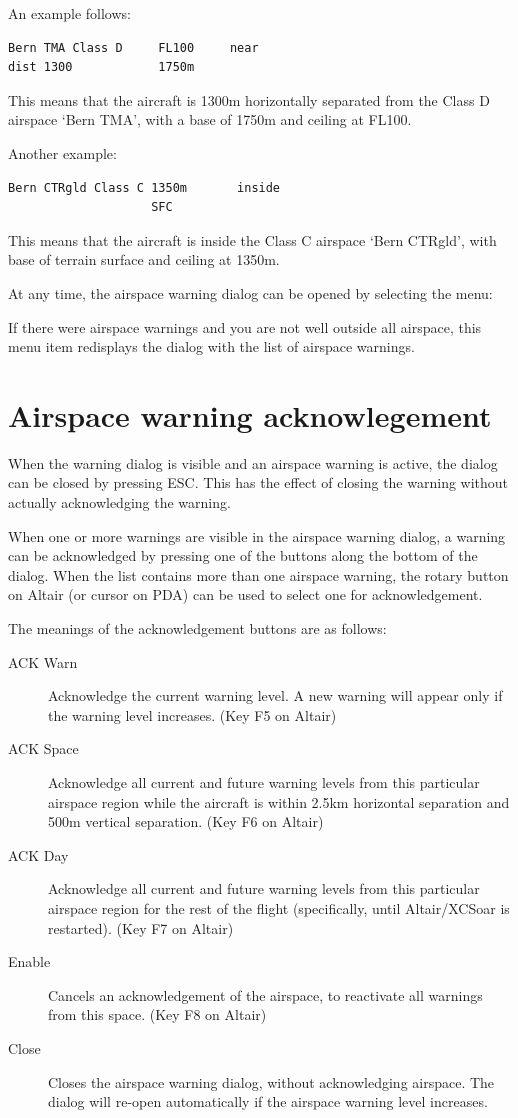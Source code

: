 \documentclass[a4paper,12pt]{refrep}
\begin{document}
An example follows:
\begin{verbatim}
Bern TMA Class D     FL100     near
dist 1300            1750m 
\end{verbatim}

This means that the aircraft is 1300m horizontally separated from the Class D airspace
`Bern TMA', with a base of 1750m and ceiling at FL100.

Another example:
\begin{verbatim}
Bern CTRgld Class C 1350m	    inside
                    SFC
\end{verbatim}

This means that the aircraft is inside the Class C airspace `Bern
CTRgld', with base of terrain surface and ceiling at 1350m.

At any time, the airspace warning dialog can be opened by selecting
the menu:

\blink{}

If there were airspace warnings and you are not well outside all airspace, this
menu item redisplays the dialog with the list of airspace warnings.


\section{Airspace warning acknowlegement}

When the warning dialog is visible and an airspace warning is active, the
dialog can be closed by pressing ESC.  This has the effect of closing the
warning without actually acknowledging the warning.  

When one or more warnings are visible in the airspace warning dialog,
a warning can be acknowledged by pressing one of the buttons along the bottom
of the dialog.  When the list contains more than one airspace warning,
the rotary button on Altair (or cursor on PDA) can be used to select one
for acknowledgement.

The meanings of the acknowledgement buttons are as follows:
\begin{description}
\item[ACK Warn]  Acknowledge the current warning level.  A new warning will appear
only if the warning level increases.  (Key F5 on Altair)
\item[ACK Space]  Acknowledge all current and future warning levels from this 
particular airspace region while the aircraft is within 2.5km horizontal separation
and 500m vertical separation. (Key F6 on Altair)
\item[ACK Day]  Acknowledge all current and future warning levels from this particular
airspace region for the rest of the flight (specifically, until Altair/XCSoar 
is restarted). (Key F7 on Altair)
\item[Enable]  Cancels an acknowledgement of the airspace, to reactivate all warnings
from this space. (Key F8 on Altair)
\item[Close] Closes the airspace warning dialog, without acknowledging airspace.
  The dialog will re-open automatically if the airspace warning level increases.
\end{description}
\end{document}
